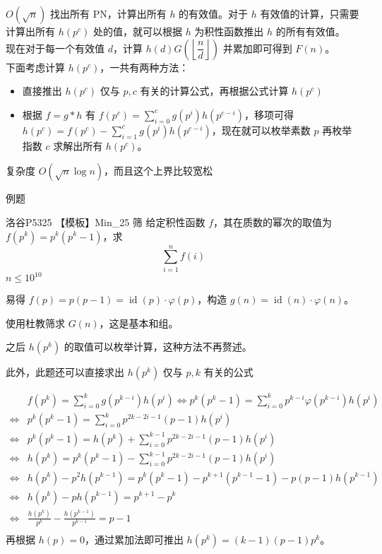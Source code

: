 \documentclass[UTF8]{beamer}
\begin{document}
\begin{frame}
$O(\sqrt{n})$ 找出所有 PN，计算出所有 $h$ 的有效值。对于 $h$ 有效值的计算，只需要计算出所有 $h(p^c)$ 处的值，就可以根据 $h$ 为积性函数推出 $h$ 的所有有效值。\\

现在对于每一个有效值 $d$，计算 
$h(d)G\left(\left\lfloor \dfrac{n}{d} \right\rfloor\right)$ 并累加即可得到 $F(n)$。\\

下面考虑计算 $h(p^c)$，一共有两种方法：
\begin{itemize}
    \item 直接推出 $h(p^c)$ 仅与 $p,c$ 有关的计算公式，再根据公式计算 $h(p^c)$\\
    \item 根据 $f = g \ast h$ 有 
    $f(p^c) = \sum_{i=0}^c g(p^i)h(p^{c-i})$，移项可得 
    $h(p^c) = f(p^c) - \sum_{i=1}^{c}g(p^i)h(p^{c-i})$，现在就可以枚举素数 $p$ 再枚举指数 $c$ 求解出所有 $h(p^c)$。
    
\end{itemize}
\pause
复杂度 $O(\sqrt n\log n)$，而且这个上界比较宽松
\end{frame}
\begin{frame}{例题}
    \begin{block}{洛谷P5325 【模板】Min\_25 筛}
        给定积性函数 $f$，其在质数的幂次的取值为 $f(p^k) = p^k(p^k-1)$，求 
        $$
        \sum_{i=1}^{n} f(i)
        $$
        $n\le 10^{10}$
    \end{block}
\pause

易得 $f(p) = p(p-1) = \operatorname{id}(p)\cdot \varphi(p)$，构造 $g(n) = \operatorname{id}(n)\cdot\varphi(n)$。

使用杜教筛求 $G(n)$，这是基本和组。

之后 $h(p^k)$ 的取值可以枚举计算，这种方法不再赘述。\\
\pause

此外，此题还可以直接求出 $h(p^k)$ 仅与 $p, k$ 有关的公式
\end{frame}
\begin{frame}
\vspace{-1em}
$$
\begin{aligned}
& f(p^k) = \sum_{i=0}^{k} g(p^{k-i})h(p^i)\iff  p^k(p^k-1) = \sum_{i=0}^{k} p^{k-i}\varphi(p^{k-i}) h(p^i)\\
\iff & p^k(p^k-1) = \sum_{i=0}^{k} p^{2k-2i-1}(p - 1) h(p^i)\\
\iff & p^k(p^k-1) = h(p^k) + \sum_{i=0}^{k-1} p^{2k-2i-1}(p - 1) h(p^i)\\
\iff & h(p^k) = p^k(p^k-1) - \sum_{i=0}^{k-1} p^{2k-2i-1}(p - 1) h(p^i)\\
\iff & h(p^k) - p^2h(p^{k-1}) = p^{k}(p^k-1)-p^{k+1}(p^{k-1}-1) - p(p-1)h(p^{k-1})\\
\iff & h(p^k) - ph(p^{k-1}) = p^{k+1} - p^k\\
\iff & \frac{h(p^k)}{p^k} - \frac{h(p^{k-1})}{p^{k-1}} = p - 1\\
\end{aligned}
$$
再根据 $h(p) = 0$，通过累加法即可推出 $h(p^k) = (k-1)(p-1)p^k$。
\end{frame}
\end{document}
